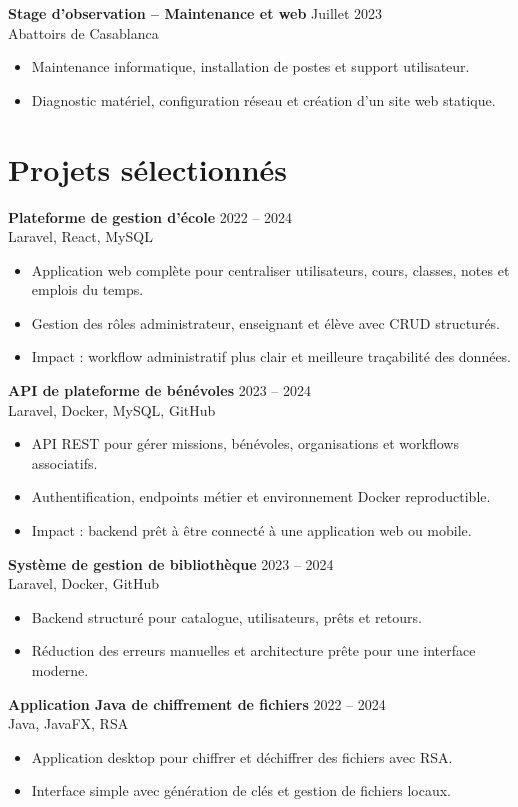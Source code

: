 \documentclass[10pt,a4paper]{article}
\newcommand{\entry}[4]{
  \textbf{#1} \hfill {\small\color{muted} #2}\\
  {\color{accent}#3}\\[-2pt]
  #4
}
\begin{document}
\entry{Stage d'observation -- Maintenance et web}{Juillet 2023}{Abattoirs de Casablanca}{
\begin{itemize}
  \item Maintenance informatique, installation de postes et support utilisateur.
  \item Diagnostic matériel, configuration réseau et création d'un site web statique.
\end{itemize}
}

\section*{Projets sélectionnés}
\entry{Plateforme de gestion d'école}{2022 -- 2024}{Laravel, React, MySQL}{
\begin{itemize}
  \item Application web complète pour centraliser utilisateurs, cours, classes, notes et emplois du temps.
  \item Gestion des rôles administrateur, enseignant et élève avec CRUD structurés.
  \item Impact : workflow administratif plus clair et meilleure traçabilité des données.
\end{itemize}
}

\entry{API de plateforme de bénévoles}{2023 -- 2024}{Laravel, Docker, MySQL, GitHub}{
\begin{itemize}
  \item API REST pour gérer missions, bénévoles, organisations et workflows associatifs.
  \item Authentification, endpoints métier et environnement Docker reproductible.
  \item Impact : backend prêt à être connecté à une application web ou mobile.
\end{itemize}
}

\entry{Système de gestion de bibliothèque}{2023 -- 2024}{Laravel, Docker, GitHub}{
\begin{itemize}
  \item Backend structuré pour catalogue, utilisateurs, prêts et retours.
  \item Réduction des erreurs manuelles et architecture prête pour une interface moderne.
\end{itemize}
}

\entry{Application Java de chiffrement de fichiers}{2022 -- 2024}{Java, JavaFX, RSA}{
\begin{itemize}
  \item Application desktop pour chiffrer et déchiffrer des fichiers avec RSA.
  \item Interface simple avec génération de clés et gestion de fichiers locaux.
\end{itemize}
}
\end{document}
